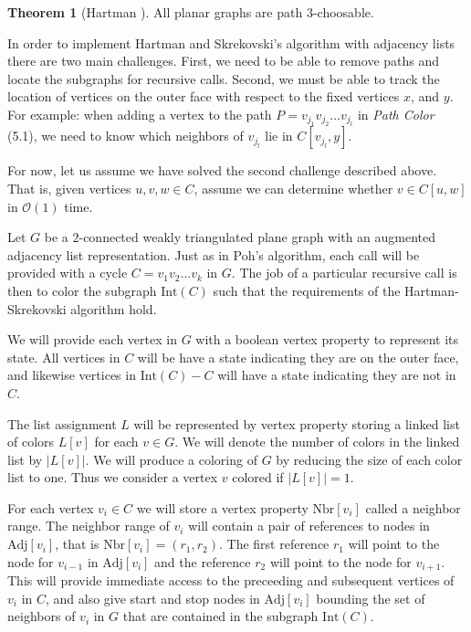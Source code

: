 \documentclass[letterpaper, 12pt]{article}
\theoremstyle{definition}
\theoremstyle{definition}
\theoremstyle{thm}
\newtheorem{theorem}{Theorem}[section]
\theoremstyle{definition}
\begin{document}
\begin{theorem}[Hartman \cite{hartman}]
All planar graphs are path $3$-choosable.
\end{theorem}

In order to implement Hartman and Skrekovski's algorithm with adjacency lists
there are two main challenges. First, we need to be able to remove paths and
locate the subgraphs for recursive calls. Second, we must be able to track the
location of vertices on the outer face with respect to the fixed vertices
$x$, and $y$. For example: when adding a vertex to the path
$P=v_{j_1}v_{j_2}\ldots v_{j_l}$ in \textit{Path Color} (5.1), we need to know
which neighbors of $v_{j_l}$ lie in $C[v_{j_l},y]$.

For now, let us assume we have solved the second challenge described above. That
is, given vertices $u,v,w\in C$, assume we can determine whether $v\in C[u,w]$
in $\mathcal{O}(1)$ time.

Let $G$ be a $2$-connected weakly triangulated plane graph with an augmented
adjacency list representation. Just as in Poh's algorithm, each call will be
provided with a cycle $C=v_1v_2\ldots v_k$ in $G$. The
job of a particular recursive call is then to color the subgraph $\text{Int}(C)$
such that the requirements of the Hartman-Skrekovski algorithm hold.

We will provide each vertex in $G$ with a boolean vertex property to represent
its state. All vertices in $C$ will be have a state indicating they are on the
outer face, and likewise vertices in $\text{Int}(C)-C$ will have a state
indicating they are not in $C$.

The list assignment $L$ will be represented by vertex property storing a linked
list of colors $L[v]$ for each $v\in G$. We will denote the number of colors
in the linked list by $|L[v]|$. We will produce a coloring of $G$ by reducing
the size of each color list to one. Thus we consider a vertex $v$
colored if $|L[v]|=1$.

For each vertex $v_i\in C$ we will store a vertex property $\text{Nbr}[v_i]$
called a neighbor range. The neighbor range of $v_i$ will contain a pair of
references to nodes in $\text{Adj}[v_i]$, that is $\text{Nbr}[v_i]=(r_1,r_2)$.
The first reference $r_1$ will point to the
node for $v_{i-1}$ in $\text{Adj}[v_i]$ and the reference $r_2$ will point to
the node for $v_{i+1}$. This
will provide immediate access to the preceeding and subsequent vertices of $v_i$
in $C$, and also give start and stop nodes in $\text{Adj}[v_i]$ bounding the set
of neighbors of $v_i$ in $G$ that are contained in the subgraph
$\text{Int}(C)$.\\
\end{document}
